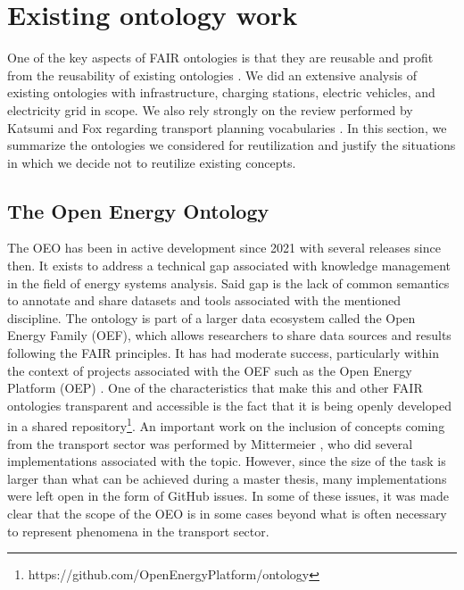 \section{Existing ontology work}
\label{existingontologies}

One of the key aspects of FAIR ontologies is that they are reusable and profit
from the reusability of existing ontologies \cite{PovedaVillalon.2020}. We did
an extensive analysis of existing ontologies with infrastructure, charging
stations, electric vehicles, and electricity grid in scope. We also rely
strongly on the review performed by Katsumi and Fox regarding transport planning
vocabularies \cite{Katsumi.2018}. In this section, we summarize the ontologies
we considered for reutilization and justify the situations in which we decide
not to reutilize existing concepts.


\subsection{The Open Energy Ontology}

The OEO has been in active development since 2021 with several releases since
then. It exists to address a technical gap associated with knowledge management
in the field of energy systems analysis. Said gap is the lack of common
semantics to annotate and share datasets and tools associated with the mentioned
discipline. The ontology is part of a larger data ecosystem called the Open
Energy Family (OEF), which allows researchers to share data sources and results
following the FAIR principles. It has had moderate success, particularly within
the context of projects associated with the OEF such as the Open Energy Platform
(OEP) \cite{Hulk.2024}. One of the characteristics that make this and other FAIR
ontologies transparent and accessible is the fact that it is being openly
developed in a shared
repository\footnote{https://github.com/OpenEnergyPlatform/ontology}. An
important work on the inclusion of concepts coming from the transport sector was
performed by Mittermeier \cite{Mittermeier.2023}, who did several
implementations associated with the topic. However, since the size of the task
is larger than what can be achieved during a master thesis, many implementations
were left open in the form of GitHub issues. In some of these issues, it was
made clear that the scope of the OEO is in some cases beyond what is often
necessary to represent phenomena in the transport sector.


